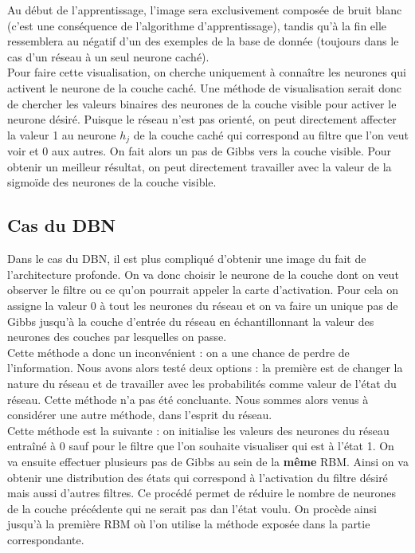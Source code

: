\documentclass[a4paper,oneside]{report}
\begin{document}
                Au début de l'apprentissage, l'image sera exclusivement composée de bruit blanc (c'est 
une conséquence de l'algorithme d'apprentissage), tandis qu'à la fin elle ressemblera 
au négatif d'un des 
exemples de la base de donnée (toujours dans le cas d'un réseau à un seul neurone caché).\\

Pour faire cette visualisation, on cherche uniquement à connaître les neurones qui activent le neurone de la couche caché. 
Une méthode de visualisation serait donc de chercher les valeurs binaires  des neurones de la couche visible pour 
activer le neurone désiré. Puisque le réseau n'est pas orienté, on peut directement affecter la valeur 1 au neurone \textit{$h_{j}$} 
de la couche caché qui correspond au filtre que l'on veut voir et 0 aux autres. On fait alors un pas de Gibbs vers la couche visible. Pour obtenir un meilleur résultat, 
on peut directement travailler avec la valeur de la sigmoïde des neurones de la couche visible.

\subsection{Cas du DBN}

Dans le cas du DBN, il est plus compliqué d'obtenir une image du fait de l'architecture profonde. On va donc choisir le neurone de la couche dont  on veut observer le filtre ou ce qu'on pourrait appeler la carte d'activation. Pour cela on assigne la valeur 0 à tout les neurones du réseau et on va faire un unique pas de Gibbs jusqu'à la couche d'entrée du réseau en échantillonnant la valeur des neurones des couches par lesquelles on passe.\\

Cette méthode a donc un inconvénient : on a une chance de perdre de l'information. Nous avons alors testé deux options : la première est de changer la nature du réseau et de travailler avec les probabilités comme valeur de l'état du réseau. Cette méthode n'a pas été concluante. Nous sommes alors venus à considérer une autre méthode, dans l'esprit du réseau. \\

Cette méthode est la suivante : on initialise les valeurs des neurones du réseau entraîné à 0 sauf pour le filtre que l'on souhaite visualiser qui est à l'état 1. On va ensuite effectuer plusieurs pas de Gibbs au sein de la \textbf{même} RBM. Ainsi on va obtenir une distribution des états qui correspond à l'activation du filtre désiré mais aussi d'autres filtres. Ce procédé permet de réduire le nombre de neurones de la couche précédente qui ne serait pas dan l'état voulu. On procède ainsi jusqu'à la première RBM où l'on utilise la méthode exposée dans la partie correspondante.\\
\end{document}
